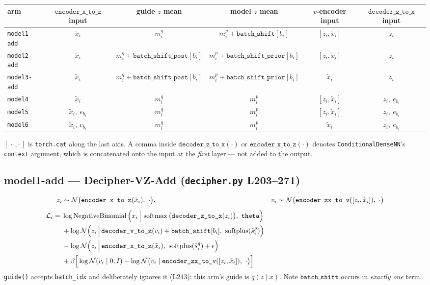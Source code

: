 \documentclass[11pt]{article}
\newcommand{\encxz}{\texttt{encoder\_x\_to\_z}}
\newcommand{\enczxv}{\texttt{encoder\_zx\_to\_v}}
\newcommand{\decvz}{\texttt{decoder\_v\_to\_z}}
\newcommand{\deczx}{\texttt{decoder\_z\_to\_x}}
\newcommand{\bshift}{\texttt{batch\_shift}}
\newcommand{\bprior}{\texttt{batch\_shift\_prior}}
\newcommand{\bpost}{\texttt{batch\_shift\_post}}
\newcommand{\thetapar}{\texttt{theta}}
\newcommand{\sfp}{\operatorname{softplus}}
\newcommand{\smax}{\operatorname{softmax}}
\newcommand{\NB}{\operatorname{NegativeBinomial}}
\newcommand{\Norm}{\mathcal{N}}
\begin{document}
\begin{center}\small
\begin{tabular}{@{}lccccc@{}}
\toprule
arm & $\encxz$ input & guide $z$ mean & model $z$ mean & $v$-encoder input & $\deczx$ input \\
\midrule
\texttt{model1-add} & $\tilde{x}_i$ & $m^{q}_i$ & $m^{p}_i + \bshift[b_i]$ & $[z_i, \tilde{x}_i]$ & $z_i$ \\
\texttt{model2-add} & $\tilde{x}_i$ & $m^{q}_i + \bpost[b_i]$ & $m^{p}_i + \bprior[b_i]$ & $[z_i, \tilde{x}_i]$ & $z_i$ \\
\texttt{model3-add} & $\tilde{x}_i$ & $m^{q}_i + \bpost[b_i]$ & $m^{p}_i + \bprior[b_i]$ & $\tilde{x}_i$ & $z_i$ \\
\texttt{model4} & $\tilde{x}_i$ & $m^{q}_i$ & $m^{p}_i$ & $[z_i, \tilde{x}_i]$ & $z_i,\ e_{b_i}$ \\
\texttt{model5} & $\tilde{x}_i,\ e_{b_i}$ & $m^{q}_i$ & $m^{p}_i$ & $[z_i, \tilde{x}_i]$ & $z_i,\ e_{b_i}$ \\
\texttt{model6} & $\tilde{x}_i,\ e_{b_i}$ & $m^{q}_i$ & $m^{p}_i$ & $\tilde{x}_i$ & $z_i,\ e_{b_i}$ \\
\bottomrule
\end{tabular}
\end{center}

\noindent
$[\,\cdot\,,\cdot\,]$ is \texttt{torch.cat} along the last axis. A comma inside
$\deczx(\cdot)$ or $\encxz(\cdot)$ denotes \texttt{ConditionalDenseNN}'s \texttt{context}
argument, which is concatenated onto the input at the \emph{first} layer --- not added to the
output.

\subsection*{model1-add --- Decipher-VZ-Add \hfill\normalfont\small(\texttt{decipher.py} L203--271)}
\begin{align}
z_i &\sim \Norm\big(\encxz(\tilde{x}_i),\ \cdot\big), &
v_i &\sim \Norm\big(\enczxv([z_i,\tilde{x}_i]),\ \cdot\big) \notag \\[4pt]
\mathcal{L}_i =\;& \log \NB\Big(x_i \,\Big|\, \smax\big(\deczx(z_i)\big),\ \thetapar\Big) \notag\\
&+ \log \Norm\Big(z_i \,\Big|\, \decvz(v_i) + \bshift[b_i],\ \sfp(\tilde{s}^{p}_i)\Big) \notag\\
&- \log \Norm\Big(z_i \,\Big|\, \encxz(\tilde{x}_i),\ \sfp(\tilde{s}^{q}_i)+\epsilon\Big) \notag\\
&+ \beta\Big[\log \Norm(v_i \mid 0, I) - \log \Norm\big(v_i \mid \enczxv([z_i,\tilde{x}_i]),\ \cdot\big)\Big]
\end{align}
\texttt{guide()} accepts \texttt{batch\_idx} and deliberately ignores it (L243): this arm's
guide is $q(z\mid x)$. Note $\bshift$ occurs in \emph{exactly one} term.
\end{document}
